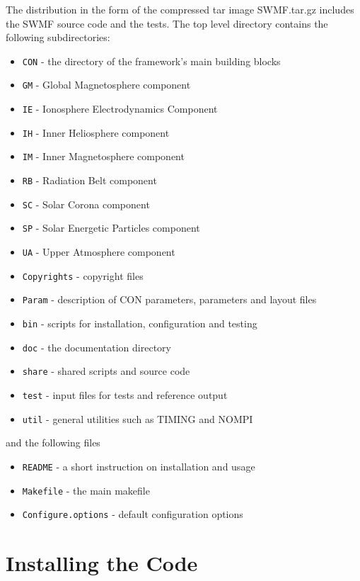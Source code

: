 The distribution in the form of the compressed tar image
SWMF.tar.gz includes the SWMF source code and the tests.
The top level directory contains the following subdirectories:
\begin{itemize}
\item {\tt CON}   - the directory of the framework's main building blocks
\item {\tt GM}    - Global Magnetosphere component       %
\item {\tt IE}    - Ionosphere Electrodynamics Component %
\item {\tt IH}    - Inner Heliosphere component          %
\item {\tt IM}    - Inner Magnetosphere component        %
\item {\tt RB}    - Radiation Belt component             %
\item {\tt SC}    - Solar Corona component               %
\item {\tt SP}    - Solar Energetic Particles component  %
\item {\tt UA}    - Upper Atmosphere component           %
\item {\tt Copyrights} - copyright files
\item {\tt Param} - description of CON parameters, parameters and layout files
\item {\tt bin}   - scripts for installation, configuration and testing
\item {\tt doc}   - the documentation directory %
\item {\tt share} - shared scripts and source code
\item {\tt test}  - input files for tests and reference output
\item {\tt util}  - general utilities such as TIMING and NOMPI
\end{itemize}
and the following files
\begin{itemize}
\item {\tt README}   - a short instruction on installation and usage
\item {\tt Makefile} - the main makefile
\item {\tt Configure.options} - default configuration options %
\end{itemize}

\section{Installing the Code}

